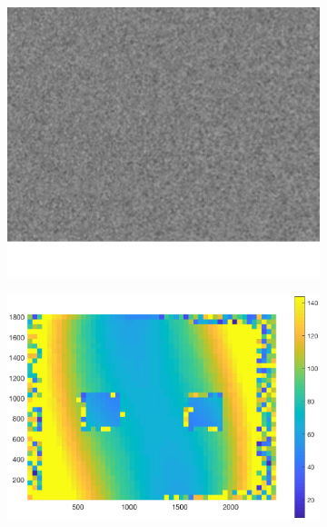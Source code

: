 \begin{figure}[h!]
\begin{subfigure}[t]{0.18\linewidth}
	\end{subfigure}
	\begin{subfigure}[t]{0.18\linewidth}
		\centering
		\includegraphics[width=0.8\linewidth]{figures/part2/test_right_2}
	\end{subfigure}
	\begin{subfigure}[t]{0.20\linewidth}
		\centering
		\includegraphics[width=1\linewidth]{figures/part2/test2_cmp}
	\end{subfigure}
	\begin{subfigure}[t]{0.20\linewidth}
		\centering

\end{subfigure}
\end{figure}

